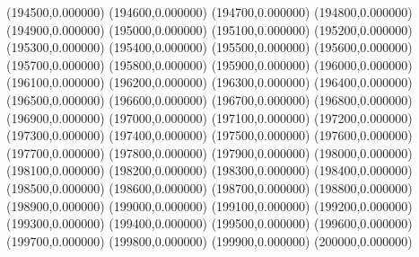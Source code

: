 (194500,0.000000)
(194600,0.000000)
(194700,0.000000)
(194800,0.000000)
(194900,0.000000)
(195000,0.000000)
(195100,0.000000)
(195200,0.000000)
(195300,0.000000)
(195400,0.000000)
(195500,0.000000)
(195600,0.000000)
(195700,0.000000)
(195800,0.000000)
(195900,0.000000)
(196000,0.000000)
(196100,0.000000)
(196200,0.000000)
(196300,0.000000)
(196400,0.000000)
(196500,0.000000)
(196600,0.000000)
(196700,0.000000)
(196800,0.000000)
(196900,0.000000)
(197000,0.000000)
(197100,0.000000)
(197200,0.000000)
(197300,0.000000)
(197400,0.000000)
(197500,0.000000)
(197600,0.000000)
(197700,0.000000)
(197800,0.000000)
(197900,0.000000)
(198000,0.000000)
(198100,0.000000)
(198200,0.000000)
(198300,0.000000)
(198400,0.000000)
(198500,0.000000)
(198600,0.000000)
(198700,0.000000)
(198800,0.000000)
(198900,0.000000)
(199000,0.000000)
(199100,0.000000)
(199200,0.000000)
(199300,0.000000)
(199400,0.000000)
(199500,0.000000)
(199600,0.000000)
(199700,0.000000)
(199800,0.000000)
(199900,0.000000)
(200000,0.000000)
